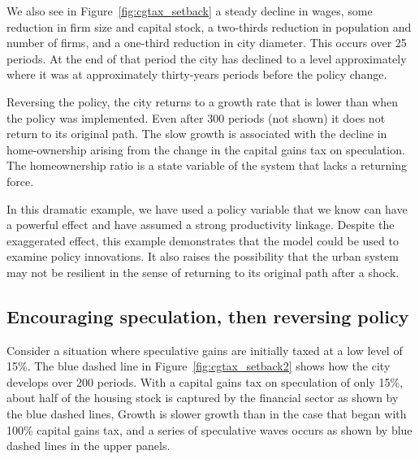 We also see in Figure~\ref{fig:cgtax_setback} a steady decline in wages, some reduction in firm size and capital stock, a two-thirds reduction in population and number of firms, and a one-third reduction in city diameter. This occurs over 25 periods.  At the end of that period the city has declined to a level approximately where it was at approximately thirty-years periods before the policy change.

Reversing the policy, the city returns to a growth rate that is lower than when the policy was implemented. Even after 300 periods (not shown) it does not return to its original path. The slow growth is associated with the decline in home-ownership arising from the change in the capital gains tax on speculation. 
The homeownership ratio is a state variable of the system that lacks a returning force.

In this dramatic example, we have used a policy variable that we know can have a powerful effect and have assumed a strong productivity linkage. Despite the exaggerated effect, this example demonstrates that the model could be used to examine policy innovations. It also raises the possibility that the urban system may not be resilient in the sense of returning to its original path after a shock.



\subsection{Encouraging speculation, then reversing  policy}
Consider a situation where speculative gains are initially taxed at a low level of 15\%. The blue dashed line in Figure~\ref{fig:cgtax_setback2} shows how the city develops over 200 periods. 
With a capital gains tax on speculation of only 15\%,  about half of the housing stock is captured by the financial sector as shown by the blue dashed lines, Growth is slower growth than in the case that began with 100\% capital gains tax, and a series of speculative waves occurs as shown by blue dashed lines in the upper panels.  


